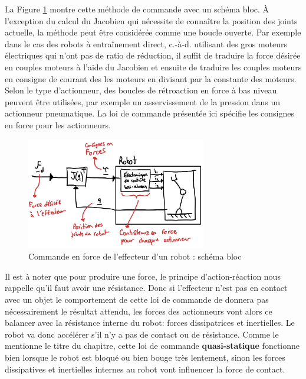 La Figure \ref{fig:forcecontroleffectorbloc} montre cette méthode de commande avec un schéma bloc. À l'exception du calcul du Jacobien qui nécessite de connaître la position des joints actuelle, la méthode peut être considérée comme une boucle ouverte. Par exemple dans le cas des robots à entraînement direct, c.-à-d. utilisant des gros moteurs électriques qui n'ont pas de ratio de réduction, il suffit de traduire la force désirée en couples moteurs à l'aide du Jacobien et ensuite de traduire les couples moteurs en consigne de courant des les moteurs en divisant par la constante des moteurs. Selon le type d'actionneur, des boucles de rétroaction en force à bas niveau peuvent être utilisées, par exemple un asservissement de la pression dans un actionneur pneumatique. La loi de commande présentée ici spécifie les consignes en force pour les actionneurs.
\begin{figure}[H]
	\centering
	\includegraphics[width=0.70\textwidth]{fig/forcecontroleffectorbloc.jpg}
	\caption{Commande en force de l'effecteur d'un robot : schéma bloc}
	\label{fig:forcecontroleffectorbloc}
\end{figure}

Il est à noter que pour produire une force, le principe d'action-réaction nous rappelle qu'il faut avoir une résistance. Donc si l'effecteur n'est pas en contact avec un objet le comportement de cette loi de commande de donnera pas nécessairement le résultat attendu, les forces des actionneurs vont alors ce balancer avec la résistance interne du robot: forces dissipatrices et inertielles. Le robot va donc accélérer s'il n'y a pas de contact ou de résistance. Comme le mentionne le titre du chapitre, cette loi de commande \textbf{quasi-statique} fonctionne bien lorsque le robot est bloqué ou bien bouge très lentement, sinon les forces dissipatives et inertielles internes au robot vont influencer la force de contact.



